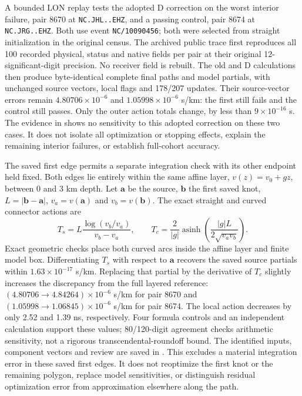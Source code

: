 A bounded LON replay tests the adopted D correction on the worst interior
failure, pair 8670 at \texttt{NC.JHL..EHZ}, and a passing control, pair 8674 at
\texttt{NC.JRG..EHZ}. Both use event \texttt{NC/10090456}; both were selected
from straight initialization in the original census. The archived public trace first reproduces all
100 recorded physical, status and native fields per pair at their original
12-significant-digit precision. No receiver field is rebuilt. The old and D
calculations then produce byte-identical complete final paths and model
partials, with unchanged source vectors, local flags and 178/207 updates.
Their source-vector errors remain $4.80706\times10^{-6}$ and
$1.05998\times10^{-6}$ s/km: the first still fails and the control still passes.
Only the outer action totals change, by less than $9\times10^{-16}$ s.
The evidence in
shows no sensitivity to this adopted correction on these two cases. It does
not isolate all optimization or stopping effects, explain the remaining
interior failures, or establish full-cohort accuracy.

The saved first edge permits a separate integration check with its other
endpoint held fixed. Both edges lie entirely within the same affine layer,
$v(z)=v_0+gz$, between 0 and 3 km depth. Let $\mathbf a$ be the source,
$\mathbf b$ the first saved knot, $L=|\mathbf b-\mathbf a|$,
$v_a=v(\mathbf a)$ and $v_b=v(\mathbf b)$. The exact straight and curved
connector actions are
\begin{equation}
 T_s=L\frac{\log(v_b/v_a)}{v_b-v_a},\qquad
 T_c=\frac{2}{|g|}\operatorname{asinh}
 \left(\frac{|g|L}{2\sqrt{v_av_b}}\right).
\end{equation}
Exact geometric checks place both curved arcs inside the affine layer and
finite model box. Differentiating $T_s$ with respect to $\mathbf a$ recovers
the saved source partials within $1.63\times10^{-17}$ s/km. Replacing that
partial by the derivative of $T_c$ slightly increases the discrepancy from
the full layered reference: $(4.80706\to4.84264)\times10^{-6}$ s/km
for pair 8670 and $(1.05998\to1.06845)\times10^{-6}$ s/km for pair 8674.
The local action decreases by only 2.52 and 1.39 ns, respectively.
Four formula controls and an independent calculation support these values;
80/120-digit agreement checks arithmetic sensitivity, not a rigorous
transcendental-roundoff bound. The identified inputs, component vectors and
review are saved in
.
This excludes a material integration error in these saved first edges.
It does not reoptimize the first knot or the remaining polygon, replace model
sensitivities, or distinguish residual optimization error from approximation
elsewhere along the path.

